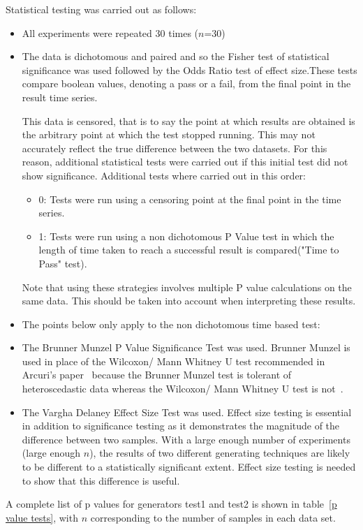 \documentclass[]{article}
\begin{document}
Statistical testing was carried out as follows: 
\begin{itemize}
\item{All experiments were repeated 30 times ($n$=30)}
\item{The data is dichotomous and paired and so the Fisher test of statistical significance was used followed by the Odds Ratio test of effect size.These tests compare boolean values, denoting a pass or a fail, from the final point in the result time series. 

This data is censored, that is to say the point at which results are obtained is the arbitrary point at which the test stopped running. This may not accurately reflect the true difference between the two datasets. For this reason, additional statistical tests were carried out if this initial test did not show significance. Additional tests where carried out in this order:
\begin{itemize}
\item{0: Tests were run using a censoring point at the final point in the time series.}
\item{1: Tests were run using a non dichotomous P Value test in which the length of time taken to reach a successful result is compared("Time to Pass" test).}
\end{itemize}Note that using these strategies involves multiple P value calculations on the same data. This should be taken into account when interpreting these results.
}
\item{The points below only apply to the non dichotomous time based test:}
\item{The Brunner Munzel P Value Significance Test was used. Brunner Munzel is used in place of the  Wilcoxon/ Mann Whitney U test recommended in Arcuri's paper~\cite{Arcuri2012} because the Brunner Munzel test is tolerant of heteroscedastic data whereas the Wilcoxon/ Mann Whitney U test is not~\cite{Brunner2000}.}
\item{The Vargha Delaney Effect Size Test was used. Effect size testing is essential in addition to significance testing as it demonstrates the magnitude of the difference between two samples. With a large enough number of experiments (large enough $n$), the results of two different generating techniques are likely to be different to a statistically significant extent. Effect size testing is needed to show that this difference is useful.}
\end{itemize}A complete list of p values for generators test1 and test2 is shown in table~\ref{p value tests}, with $n$ corresponding to the number of samples in each data set.
\end{document}
